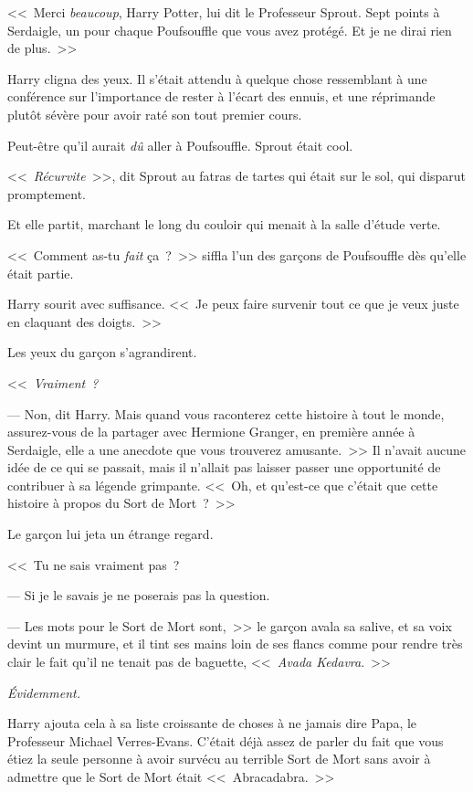<<~Merci \emph{beaucoup}, Harry Potter, lui dit le Professeur Sprout. Sept points à Serdaigle, un pour chaque Poufsouffle que vous avez protégé. Et je ne dirai rien de plus.~>>

Harry cligna des yeux. Il s'était attendu à quelque chose ressemblant à une conférence sur l'importance de rester à l'écart des ennuis, et une réprimande plutôt sévère pour avoir raté son tout premier cours.

Peut-être qu'il aurait \emph{dû} aller à Poufsouffle. Sprout était cool.

<<~\emph{Récurvite}~>>, dit Sprout au fatras de tartes qui était sur le sol, qui disparut promptement.

Et elle partit, marchant le long du couloir qui menait à la salle d'étude verte.

<<~Comment as-tu \emph{fait} ça~?~>> siffla l'un des garçons de Poufsouffle dès qu'elle était partie.

Harry sourit avec suffisance. <<~Je peux faire survenir tout ce que je veux juste en claquant des doigts.~>>

Les yeux du garçon s'agrandirent.

<<~\emph{Vraiment~?}

--- Non, dit Harry. Mais quand vous raconterez cette histoire à tout le monde, assurez-vous de la partager avec Hermione Granger, en première année à Serdaigle, elle a une anecdote que vous trouverez amusante.~>> Il n'avait aucune idée de ce qui se passait, mais il n'allait pas laisser passer une opportunité de contribuer à sa légende grimpante. <<~Oh, et qu'est-ce que c'était que cette histoire à propos du Sort de Mort~?~>>

Le garçon lui jeta un étrange regard.

<<~Tu ne sais vraiment pas~?

--- Si je le savais je ne poserais pas la question.

--- Les mots pour le Sort de Mort sont,~>> le garçon avala sa salive, et sa voix devint un murmure, et il tint ses mains loin de ses flancs comme pour rendre très clair le fait qu'il ne tenait pas de baguette, <<~\emph{Avada Kedavra}.~>>

\emph{Évidemment.}

Harry ajouta cela à sa liste croissante de choses à ne jamais dire Papa, le Professeur Michael Verres-Evans. C'était déjà assez de parler du fait que vous étiez la seule personne à avoir survécu au terrible Sort de Mort sans avoir à admettre que le Sort de Mort était <<~Abracadabra.~>>

